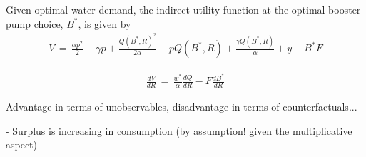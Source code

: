 \documentclass[12pt,table]{article}
\begin{document}
Given optimal water demand, the indirect utility function at the optimal booster pump choice, $B^{*}$, is given by 
\begin{align}
V\,=\,\frac{\alpha p^2}{2} - \gamma p + \frac{Q(B^{*},R)^{2}}{2\alpha} - p Q(B^{*},R) + \frac{\gamma Q(B^{*},R)}{\alpha} + y - B^{*} F
\end{align}


\begin{align}
\label{eq:dvdr}
\frac{dV}{dR}\,=\,\frac{w^{*}}{\alpha} \frac{dQ}{dR} - F \frac{dB^{*}}{dR}
\end{align}

Advantage in terms of unobservables, disadvantage in terms of counterfactuals...

- Surplus is increasing in consumption (by assumption! given the multiplicative aspect)



\end{document}
